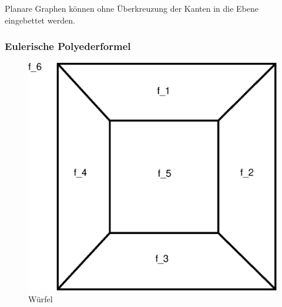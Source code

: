 Planare Graphen können ohne Überkreuzung der Kanten in die Ebene eingebettet werden.

\subsubsection{Eulerische Polyederformel}
\begin{figure}
	\centering
	\includegraphics[width=\linewidth]{15/Grafik/Polyeder}
	\caption{Würfel}
	\label{fig:Polyeder}
	\vspace{-500pt}
\end{figure}

